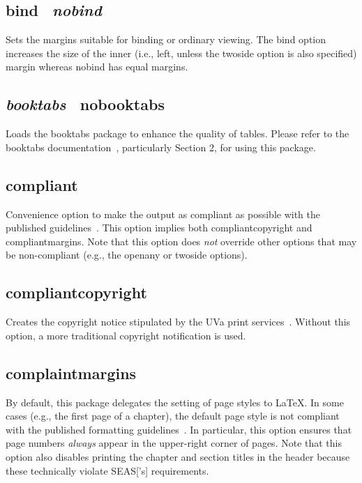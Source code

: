 \documentclass[10pt]{article}
\newcommand{\package}[1]{#1}
\newcommand{\option}[1]{#1}
\newcommand{\default}[1]{\emph{#1}}
\begin{document}
\subsection{\option{bind} \textbar\ \default{\option{nobind}}}
Sets the margins suitable for binding or ordinary viewing.
The bind option increases the size of the inner (i.e., left, unless the \option{twoside} option is also specified) margin whereas nobind has equal margins.

\subsection{\default{\option{booktabs}} \textbar\ \option{nobooktabs}}
Loads the \package{booktabs} package to enhance the quality of tables.
Please refer to the \package{booktabs} documentation~\cite{fear:booktabs}, particularly Section 2, for using this package.

\subsection{\option{compliant}}
Convenience option to make the output as compliant as possible with the published guidelines~\cite{uvaprint:thesis, seas:instructions}.
This option implies both \option{compliantcopyright} and \option{compliantmargins}.
Note that this option does \emph{not} override other options that may be non-compliant (e.g., the \option{openany} or \option{twoside} options).

\subsection{\option{compliantcopyright}}
Creates the copyright notice stipulated by the \gls{UVa} print services~\cite{uvaprint:thesis}.
Without this option, a more traditional copyright notification is used.

\subsection{\option{complaintmargins}}
By default, this package delegates the setting of page styles to \LaTeX.
In some cases (e.g., the first page of a chapter), the default page style is not compliant with the published formatting guidelines~\cite{uvaprint:thesis, seas:instructions}.
In particular, this option ensures that page numbers \emph{always} appear in the upper-right corner of pages.
Note that this option also disables printing the chapter and section titles in the header because these technically violate \gls{SEAS}['s] requirements.
\end{document}
